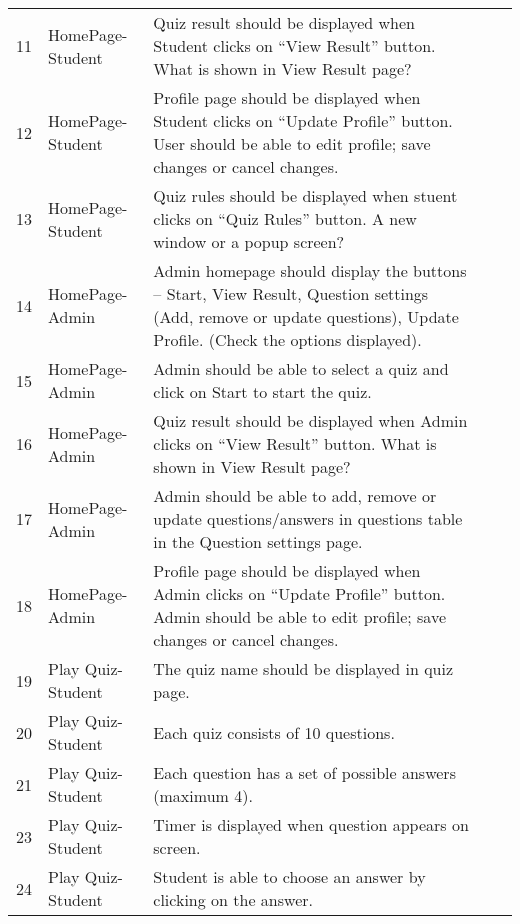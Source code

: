 \begin{landscape}
\begin{longtabu}{c l X c c}
11 & HomePage-Student & Quiz result should be displayed when Student clicks on
``View Result'' button. What is shown in View Result page? & & \\

12 & HomePage-Student & Profile page should be displayed when Student clicks on
``Update Profile'' button. User should be able to edit profile; save changes or
cancel changes. & & \\

13 & HomePage-Student & Quiz rules should be displayed when stuent clicks on
``Quiz Rules'' button. A new window or a popup screen? & & \\

14 & HomePage-Admin & Admin homepage should display the buttons – Start, View
Result, Question settings (Add, remove or update questions), Update Profile.
(Check the options displayed). & & \\

15 & HomePage-Admin & Admin should be able to select a quiz and click on Start
to start the quiz. & & \\

16 & HomePage-Admin & Quiz result should be displayed when Admin clicks on
``View Result'' button. What is shown in View Result page? & & \\

17 & HomePage-Admin & Admin should be able to add, remove or update
questions/answers in questions table in the Question settings page. & & \\

18 & HomePage-Admin & Profile page should be displayed when Admin clicks on
``Update Profile'' button. Admin should be able to edit profile; save changes or
cancel changes. & & \\

19 & Play Quiz-Student & The quiz name should be displayed in quiz page. & & \\

20 & Play Quiz-Student & Each quiz consists of 10 questions. & & \\

21 & Play Quiz-Student & Each question has a set of possible answers (maximum
4). & & \\

23 & Play Quiz-Student & Timer is displayed when question appears on screen. &
& \\

24 & Play Quiz-Student & Student is able to choose an answer by clicking on the
answer. & & \\


\end{longtabu}
\end{landscape}
